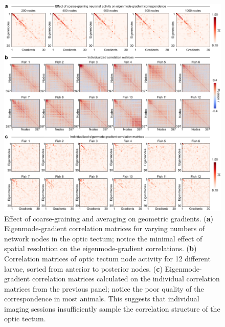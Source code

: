 \documentclass{article}
\begin{document}
\newpage

\begin{figure}[t]
    \centering
    \includegraphics[width=1.0\linewidth]{figures/supp_coarsegraining.pdf}
    \caption{Effect of coarse-graining and averaging on geometric gradients. (\textbf{a}) Eigenmode-gradient correlation matrices for varying numbers of network nodes in the optic tectum; notice the minimal effect of spatial resolution on the eigenmode-gradient correlations. (\textbf{b}) Correlation matrices of optic tectum node activity for 12 different larvae, sorted from anterior to posterior nodes. (\textbf{c}) Eigenmode-gradient correlation matrices calculated on the individual correlation matrices from the previous panel; notice the poor quality of the correspondence in most animals. This suggests that individual imaging sessions insufficiently sample the correlation structure of the optic tectum.}
    \label{supp_coarsegraining}
\end{figure}

\newpage
\end{document}
